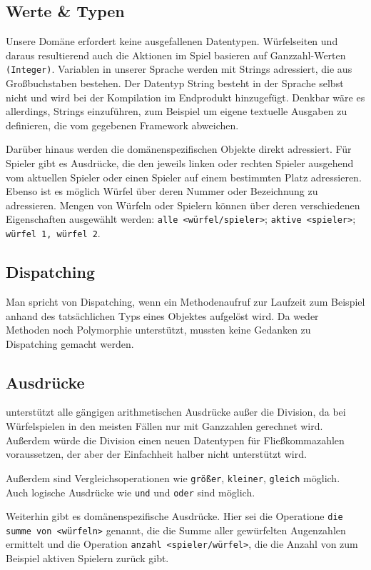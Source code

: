 	\subsection{Werte \& Typen}
	\label{sub:werte_typen}
		Unsere Domäne erfordert keine ausgefallenen Datentypen. Würfelseiten und daraus resultierend auch die Aktionen im Spiel basieren auf Ganzzahl-Werten \texttt{(Integer)}. Variablen in unserer Sprache werden mit Strings adressiert, die aus Großbuchstaben bestehen. Der Datentyp String besteht in der Sprache selbst nicht und wird bei der Kompilation im Endprodukt hinzugefügt. Denkbar wäre es allerdings, Strings einzuführen, zum Beispiel um eigene textuelle Ausgaben zu definieren, die vom gegebenen Framework abweichen.

		Darüber hinaus werden die domänenspezifischen Objekte direkt adressiert. Für Spieler gibt es Ausdrücke, die den jeweils linken oder rechten Spieler ausgehend vom aktuellen Spieler oder einen Spieler auf einem bestimmten Platz adressieren. Ebenso ist es möglich Würfel über deren Nummer oder Bezeichnung zu adressieren. Mengen von Würfeln oder Spielern können über deren verschiedenen Eigenschaften ausgewählt werden: \texttt{alle <würfel/spieler>}; \texttt{aktive <spieler>}; \texttt{würfel 1, würfel 2}.

	\subsection{Dispatching}
	\label{sub:dispatching}
		Man spricht von Dispatching, wenn ein Methodenaufruf zur Laufzeit zum Beispiel anhand des tatsächlichen Typs eines Objektes aufgelöst wird. Da \dg weder Methoden noch Polymorphie unterstützt, mussten keine Gedanken zu Dispatching gemacht werden.

	\subsection{Ausdrücke}
	\label{sub:ausdrucke}
		\dg unterstützt alle gängigen arithmetischen Ausdrücke außer die Division, da bei Würfelspielen in den meisten Fällen nur mit Ganzzahlen gerechnet wird. Außerdem würde die Division einen neuen Datentypen für Fließkommazahlen voraussetzen, der aber der Einfachheit halber nicht unterstützt wird.

		Außerdem sind Vergleichsoperationen wie \texttt{größer}, \texttt{kleiner}, \texttt{gleich} möglich. Auch logische Ausdrücke wie \texttt{und} und \texttt{oder} sind möglich.

		Weiterhin gibt es domänenspezifische Ausdrücke. Hier sei die Operatione \texttt{die summe von <würfeln>} genannt, die die Summe aller gewürfelten Augenzahlen ermittelt und die Operation \texttt{anzahl <spieler/würfel>}, die die Anzahl von zum Beispiel aktiven Spielern zurück gibt.

